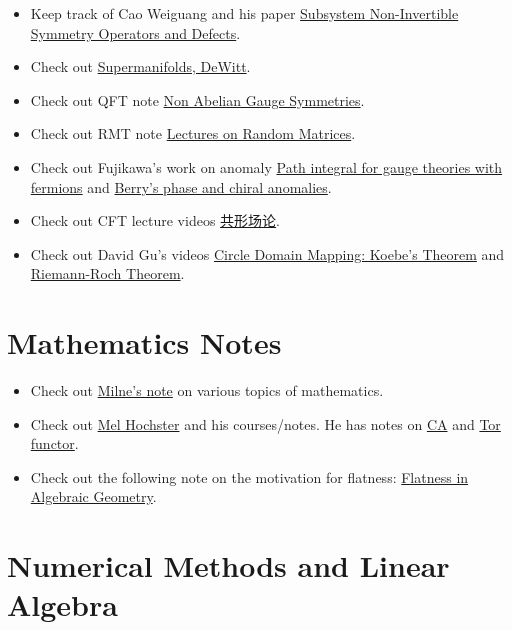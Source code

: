 \documentclass{article}
\begin{document}
\begin{itemize}
    \item Keep track of Cao Weiguang and his paper \href{https://arxiv.org/pdf/2304.09886.pdf}{Subsystem Non-Invertible Symmetry Operators and Defects}.
    \item Check out \href{https://www.cambridge.org/core/books/supermanifolds/B9914F457D773C82B850246FAA2B74EE}{Supermanifolds, DeWitt}.
    \item Check out QFT note \href{https://fma.if.usp.br/~burdman/QFT2/lecture_15.pdf}{Non Abelian Gauge Symmetries}.
    \item Check out RMT note \href{https://sites.icmc.usp.br/tiago/index.html/assets/lecnotes_rmt.pdf}{Lectures on Random Matrices}.
    \item Check out Fujikawa's work on anomaly \href{https://journals.aps.org/prd/pdf/10.1103/PhysRevD.21.2848}{Path integral for gauge theories with fermions} and \href{https://arxiv.org/pdf/2209.08334.pdf}{Berry's phase and chiral anomalies}.
    \item Check out CFT lecture videos \href{https://www.koushare.com/video/videodetail/23011}{共形场论}.
    \item Check out David Gu's videos \href{https://www.koushare.com/video/videodetail/67794}{Circle Domain Mapping: Koebe's Theorem} and \href{https://www.koushare.com/video/videodetail/67628}{Riemann-Roch Theorem}.
\end{itemize}

\section{Mathematics Notes}

\begin{itemize}
    \item Check out \href{https://www.jmilne.org/math/CourseNotes/index.html}{Milne's note} on various topics of mathematics.
    \item Check out \href{https://dept.math.lsa.umich.edu/~hochster/}{Mel Hochster} and his courses/notes.
    He has notes on \href{https://dept.math.lsa.umich.edu/~hochster/614F20/614Lx.pdf}{CA} and \href{https://dept.math.lsa.umich.edu/~hochster/615W14/Tor.pdf}{Tor functor}.
    \item Check out the following note on the motivation for flatness: \href{https://www.maths.tcd.ie/~btyrrel/flatness.pdf}{Flatness in Algebraic Geometry}.
\end{itemize}

\section{Numerical Methods and Linear Algebra}
\end{document}
